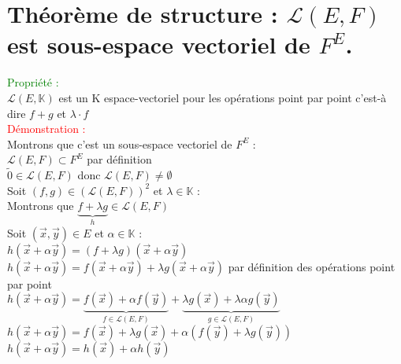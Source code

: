 \documentclass{article}
\begin{document}
\section{Théorème de structure : $\mathcal{L}(E,F)$ est sous-espace vectoriel de $F^E$.}
 \textcolor{green}{Propriété :}\\ 
 $\mathcal{L}(E, \mathbb{K})$ est un K espace-vectoriel pour les opérations point par point  c'est-à dire $f+g$ et $\lambda \cdot f$ \\ 
 \textcolor{red}{Démonstration :} \\ 
Montrons que c'est un sous-espace vectoriel de $F^E$ :  \\ 
$\mathcal{L}(E,F)\subset F^E$ par définition \\ 
$\tilde{0} \in \mathcal{L}(E,F)$ donc $\mathcal{L}(E,F) \neq \emptyset$ \\ 
Soit $(f,g) \in (\mathcal{L}(E,F))^2$ et $\lambda \in \mathbb{K}$ : \\ 
Montrons que $\underbrace{f + \lambda g}_{h} \in  \mathcal{L}(E,F)$ \\ 
Soit $(\vec{x}, \vec{y}) \in E$ et $\alpha \in \mathbb{K}$ : \\ 
$h(\vec{x}+ \alpha \vec{y}) = (f + \lambda g)(\vec{x}+ \alpha \vec{y})$ \\ 
$h(\vec{x}+ \alpha \vec{y}) = f(\vec{x}+ \alpha \vec{y})+ \lambda g (\vec{x}+ \alpha \vec{y})$ par définition des opérations point par point  \\
$h(\vec{x}+ \alpha \vec{y}) = \underbrace{f(\vec{x})+ \alpha f(\vec{y})}_{f \in \mathcal{L}(E,F)}+ \underbrace{\lambda g(\vec{x})+ \lambda \alpha g(\vec{y})}_{g \in \mathcal{L}(E,F)}$ \\ 
$h(\vec{x}+ \alpha \vec{y}) = f(\vec{x})+ \lambda g(\vec{x}) + \alpha (f(\vec{y})+ \lambda g(\vec{y}))$ \\ 
$h(\vec{x}+ \alpha \vec{y}) = h(\vec{x})+ \alpha h(\vec{y})$
\end{document}
